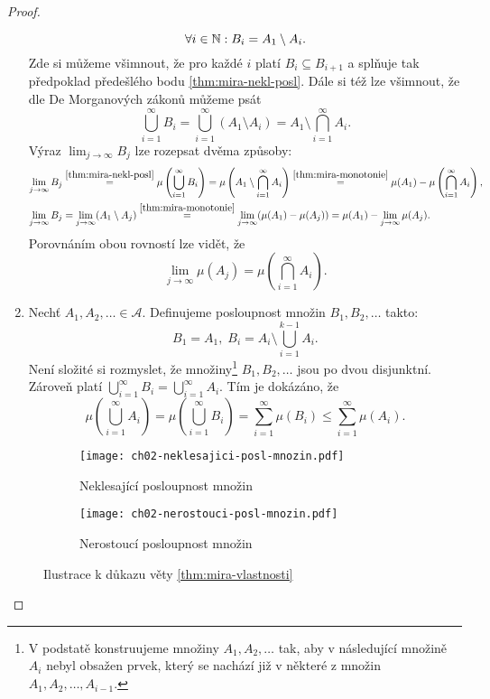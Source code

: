 \begin{proof}
\begin{enumerate}[label=\textit{(\roman*)}]
        \[\forall i\in\mathbb{N}: B_i=A_1\setminus A_i.\]
        Zde si můžeme všimnout, že pro každé $i$ platí $B_i\subseteq B_{i+1}$ a splňuje tak předpoklad předešlého bodu \ref{thm:mira-nekl-posl}. Dále si též lze všimnout, že dle De Morganových zákonů můžeme psát
        \[\bigcup_{i=1}^\infty B_i=\bigcup_{i=1}^\infty(A_1\setminus A_i)=A_1\setminus\bigcap_{i=1}^\infty A_i.\]
        Výraz $\lim_{j\to\infty}B_j$ lze rozepsat dvěma způsoby:
        \begin{align*}
            \lim\limits_{j\to\infty}B_j&\stackrel{\ref{thm:mira-nekl-posl}}{=}\mu\left(\bigcup\limits_{i=1}^\infty B_i\right)=\mu\left(A_1\setminus\bigcap\limits_{i=1}^\infty A_i\right)\stackrel{\ref{thm:mira-monotonie}}{=}\mu(A_1)-\mu\left(\bigcap\limits_{i=1}^\infty A_i\right),\\
            \lim\limits_{j\to\infty}B_j&=\lim_{j\to\infty}(A_1\setminus A_j)\stackrel{\ref{thm:mira-monotonie}}{=}\lim_{j\to\infty}(\mu(A_1)-\mu(A_j))=\mu(A_1)-\lim_{j\to\infty}\mu(A_j).
        \end{align*}
        Porovnáním obou rovností lze vidět, že
        \[\lim_{j\to\infty}\mu(A_j)=\mu\left(\bigcap\limits_{i=1}^\infty A_i\right).\]
        \item Nechť $A_1,A_2,\ldots\in\mathcal{A}$. Definujeme posloupnost množin $B_1,B_2,\ldots$ takto:
        \[B_1=A_1,\;B_i=A_i\setminus\bigcup_{i=1}^{k-1} A_i.\]
        Není složité si rozmyslet, že množiny\footnote{V podstatě konstruujeme množiny $A_1,A_2,\ldots$ tak, aby v následující množině $A_i$ nebyl obsažen prvek, který se nachází již v některé z množin $A_1,A_2,\ldots,A_{i-1}$.} $B_1,B_2,\ldots$ jsou po dvou disjunktní. Zároveň platí $\bigcup_{i=1}^\infty B_i=\bigcup_{i=1}^\infty A_i$. Tím je dokázáno, že
        \[\mu\left(\bigcup_{i=1}^\infty A_i\right)=\mu\left(\bigcup_{i=1}^\infty B_i\right)=\sum_{i=1}^{\infty}\mu(B_i)\leqslant\sum_{i=1}^{\infty}\mu(A_i).\]
    \end{enumerate}
    \begin{figure}[h]
        \centering
        \begin{subfigure}{0.45\textwidth}
            \texttt{[image: ch02-neklesajici-posl-mnozin.pdf]}
            \caption{Neklesající posloupnost množin}
            \label{fig:nekl-posl-mnozin}
        \end{subfigure}
        \qquad
        \begin{subfigure}{0.45\textwidth}
            \texttt{[image: ch02-nerostouci-posl-mnozin.pdf]}
            \caption{Nerostoucí posloupnost množin}
            \label{fig:nerost-posl-mnozin}
        \end{subfigure}
        \caption{Ilustrace k důkazu věty \ref{thm:mira-vlastnosti}}
    \end{figure}
\end{proof}